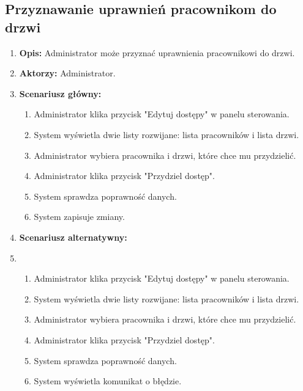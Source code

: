 \subsection{Przyznawanie uprawnień pracownikom do drzwi}
\begin{enumerate}
    \item \textbf{Opis:} Administrator może przyznać uprawnienia pracownikowi do drzwi.
    \item \textbf{Aktorzy:} Administrator.
    \item \textbf{Scenariusz główny:} 
    \begin{enumerate}
        \item Administrator klika przycisk "Edytuj dostępy" w panelu sterowania.
        \item System wyświetla dwie listy rozwijane: lista pracowników i lista drzwi.
        \item Administrator wybiera pracownika i drzwi, które chce mu przydzielić.
        \item Administrator klika przycisk "Przydziel dostęp".
        \item System sprawdza poprawność danych.
        \item System zapisuje zmiany.
    \end{enumerate}
    \item \textbf{Scenariusz alternatywny:}
    \item \begin{enumerate}
        \item Administrator klika przycisk "Edytuj dostępy" w panelu sterowania.
        \item System wyświetla dwie listy rozwijane: lista pracowników i lista drzwi.
        \item Administrator wybiera pracownika i drzwi, które chce mu przydzielić.
        \item Administrator klika przycisk "Przydziel dostęp".
        \item System sprawdza poprawność danych.
        \item System wyświetla komunikat o błędzie.
    \end{enumerate}
\end{enumerate}

